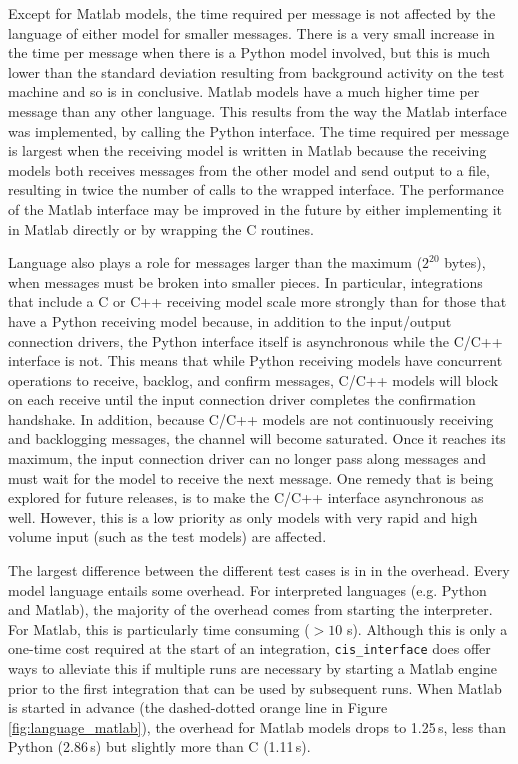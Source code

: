\documentclass[journal]{IEEEtran}
\newcommand{\cis}{{\tt cis\_interface}{}}
\begin{document}
Except for Matlab models, the time required per message is not affected by the language of either model for smaller messages. There is a very small increase in the time per message when there is a Python model involved, but this is much lower than the standard deviation resulting from background activity on the test machine and so is in conclusive. Matlab models have a much higher time per message than any other language. This results from the way the Matlab interface was implemented, by calling the Python interface. The time required per message is largest when the receiving model is written in Matlab because the receiving models both receives messages from the other model and send output to a file, resulting in twice the number of calls to the wrapped interface. The performance of the Matlab interface may be improved in the future by either implementing it in Matlab directly or by wrapping the C routines.

Language also plays a role for messages larger than the maximum ($2^{20}$ bytes), when messages must be broken into smaller pieces. In particular, integrations that include a C or C++ receiving model scale more strongly than for those that have a Python receiving model because, in addition to the input/output connection drivers, the Python interface itself is asynchronous while the C/C++ interface is not. This means that while Python receiving models have concurrent operations to receive, backlog, and confirm messages, C/C++ models will block on each receive until the input connection driver completes the confirmation handshake. In addition, because C/C++ models are not continuously receiving and backlogging messages, the channel will become saturated. Once it reaches its maximum, the input connection driver can no longer pass along messages and must wait for the model to receive the next message. One remedy that is being explored for future releases, is to make the C/C++ interface asynchronous as well. However, this is a low priority as only models with very rapid and high volume input (such as the test models) are affected.

The largest difference between the different test cases is in in the overhead. Every model language entails some overhead. For interpreted languages (e.g. Python and Matlab), the majority of the overhead comes from starting the interpreter. For Matlab, this is particularly time consuming ($>10$ s). Although this is only a one-time cost required at the start of an integration, {\cis} does offer ways to alleviate this if multiple runs are necessary by starting a Matlab engine prior to the first integration that can be used by subsequent runs. When Matlab is started in advance (the dashed-dotted orange line in Figure \ref{fig:language_matlab}), the overhead for Matlab models drops to 1.25\,s, less than Python (2.86\,s) but slightly more than C (1.11\,s).
\end{document}
